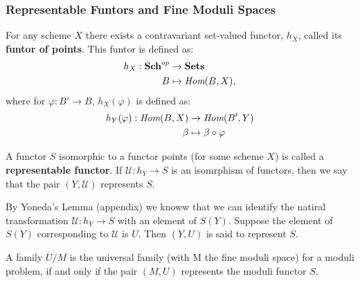 \subsubsection{Representable Funtors and Fine Moduli Spaces}
\begin{definition}
    For any scheme $X$ there exists a contravariant set-valued functor, $h_{X}$, called its \textbf{funtor of points}.
    This funtor is defined as: 
    \begin{align*}
        h_{X}: \textbf{Sch}^{op} &\to \textbf{Sets}\\
        B &\mapsto \emph{Hom}(B,X),
    \end{align*}
    where for $\varphi:B' \to B$, $h_{X}(\varphi)$ is defined as:
    \begin{align*}
        h_Y(\varphi):\emph{Hom}(B,X) &\to \emph{Hom}(B',Y)\\
        \beta &\mapsto \beta \circ \varphi
    \end{align*}
\end{definition}
\begin{definition}
    A functor $S$ isomorphic to a functor points (for some scheme $X$) is called a \textbf{representable functor}.
    If $\mathcal{U}:h_{Y}\to S$ is an isomrphism of functors, then we say that the pair $(Y, \mathcal{U})$ represents $S$.
\end{definition}
By Yoneda's Lemma (appendix) we knoww that we can identify the natiral transformation $\mathcal{U}:h_{Y}\to S$ with an element of $S(Y)$.
Suppose the element of $S(Y)$ corresponding to $\mathcal{U}$ is $U$.
Then $(Y,U)$ is said to represent $S$.
\begin{proposition}
    A family $U/M$ is the universal family (with M the fine moduli space) for a moduli problem, if and only if the pair $(M,U)$ represents the moduli functor $S$.
\end{proposition}
